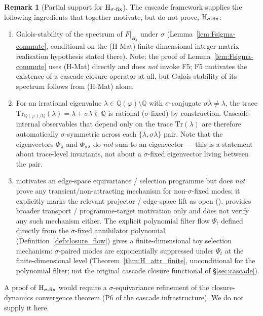 \documentclass[11pt, a4paper]{amsart}
\theoremstyle{definition}
\newtheorem{remark}[theorem]{Remark}
\newcommand{\Q}{\mathbb{Q}}
\begin{document}
\begin{remark}[Partial support for $\textup{H}_{\sigma\text{-fix}}$]\label{rmk:Hsigmafix-partial}
The cascade framework supplies the following ingredients that
together motivate, but do not prove, $\textup{H}_{\sigma\text{-fix}}$:
\begin{enumerate}
\item Galois-stability of the spectrum of $F|_{H_4}$ under
  $\sigma$ (Lemma~\ref{lem:Fsigma-commute}, conditional on the
  (H-Mat) finite-dimensional integer-matrix realisation
  hypothesis stated there).  Note: the proof of
  Lemma~\ref{lem:Fsigma-commute} uses (H-Mat) directly and does
  \emph{not} invoke F5; F5 motivates the existence of a cascade
  closure operator at all, but Galois-stability of its spectrum
  follows from (H-Mat) alone.
\item For an irrational eigenvalue $\lambda \in \Q(\varphi)
  \setminus \Q$ with $\sigma$-conjugate $\sigma\lambda \neq \lambda$,
  the trace
  $\mathrm{Tr}_{\Q(\varphi)/\Q}(\lambda)
  = \lambda + \sigma\lambda \in \Q$
  is rational ($\sigma$-fixed) by construction.  Cascade-internal
  observables that depend only on the trace
  $\mathrm{Tr}(\lambda)$ are therefore automatically
  $\sigma$-symmetric across each $\{\lambda, \sigma\lambda\}$ pair.
  Note that the eigenvectors $\Phi_\lambda$ and $\Phi_{\sigma\lambda}$
  do \emph{not} sum to an eigenvector --- this is a statement about
  trace-level invariants, not about a $\sigma$-fixed eigenvector
  living between the pair.
\item \cite{AdaptiveClosureTransport} motivates an edge-space
  equivariance / selection programme but does \emph{not} prove
  any transient/non-attracting mechanism for non-$\sigma$-fixed
  modes; it explicitly marks the relevant projector / edge-space
  lift as open
  (\cite[lines 327--328, 377--382]{AdaptiveClosureTransport}).
  \cite{TransportLaw} provides broader transport / programme-target
  motivation only and does not verify any such mechanism either.
  The explicit polynomial filter flow $\Psi_t$ defined directly from
  the $\sigma$-fixed annihilator polynomial (Definition~\ref{def:closure_flow})
  gives a finite-dimensional toy selection mechanism: $\sigma$-paired
  modes are exponentially suppressed under $\Psi_t$ at the
  finite-dimensional level (Theorem~\ref{thm:H_attr_finite},
  unconditional for the polynomial filter; not the original cascade
  closure functional of \S\ref{sec:cascade}).
\end{enumerate}
A proof of $\textup{H}_{\sigma\text{-fix}}$ would require a
$\sigma$-equivariance refinement of the closure-dynamics
convergence theorem (P6 of the cascade infrastructure). We do not
supply it here.
\end{remark}
\end{document}
